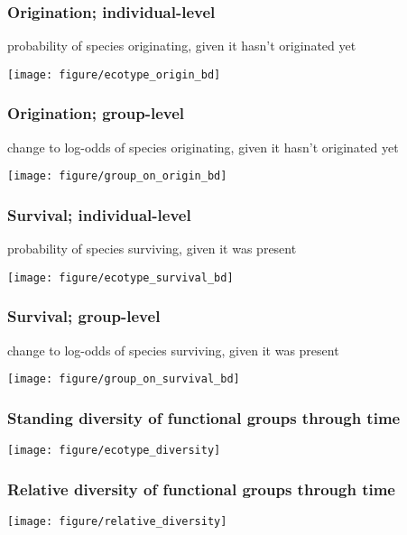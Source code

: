 \documentclass{beamer}
\begin{document}
\begin{frame}
  \frametitle{Origination; individual-level}
  \begin{center}
    probability of species originating, given it hasn't originated yet

    \texttt{[image: figure/ecotype\_origin\_bd]}
  \end{center}
\end{frame}

\begin{frame}
  \frametitle{Origination; group-level}
  \begin{center}
    change to log-odds of species originating, given it hasn't originated yet

    \texttt{[image: figure/group\_on\_origin\_bd]}
  \end{center}
\end{frame}

\begin{frame}
  \frametitle{Survival; individual-level}
  \begin{center}
    probability of species surviving, given it was present

    \texttt{[image: figure/ecotype\_survival\_bd]}
  \end{center}
\end{frame}

\begin{frame}
  \frametitle{Survival; group-level}
  \begin{center}
    change to log-odds of species surviving, given it was present

    \texttt{[image: figure/group\_on\_survival\_bd]}
  \end{center}
\end{frame}

\begin{frame}
  \frametitle{Standing diversity of functional groups through time}
  \begin{center}
    \texttt{[image: figure/ecotype\_diversity]}
  \end{center}
\end{frame}

\begin{frame}
  \frametitle{Relative diversity of functional groups through time}
  \begin{center}
    \texttt{[image: figure/relative\_diversity]}
  \end{center}
\end{frame}
\end{document}
